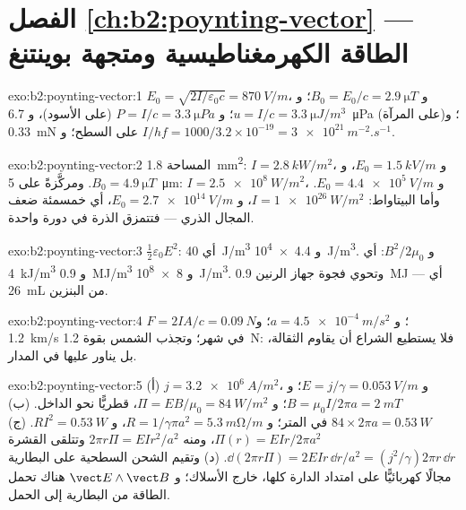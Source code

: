 \section*{الفصل \ref{ch:b2:poynting-vector} --- الطاقة الكهرمغناطيسية ومتجهة بوينتنغ}

\begin{solution}{exo:b2:poynting-vector:1}
$E_0 = \sqrt{2I/\varepsilon_0c} = \qty{870}{V/m}$، و $B_0 = E_0/c = \qty{2.9}{\micro T}$؛ و $u = I/c
= \qty{3.3}{\micro J/m^3}$؛ و $P = I/c = \qty{3.3}{\micro Pa}$ (على الأسود)، و \qty{6.7}{\micro Pa}
(على المرآة)؛ و \qty{0.33}{mN} على السطح؛ و $I/hf = 1000/3.2 \times 10^{-19} = \qty{3e21}{m^{-2}.s^{-1}}$.
\end{solution}

\begin{solution}{exo:b2:poynting-vector:2}
المساحة \qty{1.8}{mm^2}: $I = \qty{2.8}{kW/m^2}$، و $E_0 = \qty{1.5}{kV/m}$، و $B_0 = \qty{4.9}{\micro T}$.
ومركَّزةً على \qty{5}{\micro m}: $I = \qty{2.5e8}{W/m^2}$، و $E_0 = \qty{4.4e5}{V/m}$. وأما البيتاواط:
$I = \qty{1e26}{W/m^2}$، و $E_0 = \qty{2.7e14}{V/m}$، أي خمسمئة ضعف المجال
الذري --- فتتمزق الذرة في دورة واحدة.
\end{solution}

\begin{solution}{exo:b2:poynting-vector:3}
$\tfrac12\varepsilon_0E^2$: أي \qty{40}{J/m^3} و \qty{4.4e4}{J/m^3}. و $B^2/2\mu_0$: أي \qty{4}{kJ/m^3}
و \qty{0.9}{MJ/m^3} و \qty{8e8}{J/m^3}. وتحوي فجوة جهاز الرنين \qty{0.9}{MJ} --- أي \qty{26}{mL}
من البنزين.
\end{solution}

\begin{solution}{exo:b2:poynting-vector:4}
$F = 2IA/c = \qty{0.09}{N}$؛ و $a = \qty{4.5e-4}{m/s^2}$؛ و \qty{1.2}{km/s} في شهر؛
وتجذب الشمس بقوة \qty{1.2}{N}: فلا يستطيع الشراع أن يقاوم الثقالة، بل يناور
عليها في المدار.
\end{solution}

\begin{solution}{exo:b2:poynting-vector:5}
(أ) $j = \qty{3.2e6}{A/m^2}$، و $E = j/\gamma = \qty{0.053}{V/m}$؛ و $B = \mu_0I/2\pi a = \qty{2}{mT}$؛
و $\Pi = EB/\mu_0 = \qty{84}{W/m^2}$، قطريًّا نحو الداخل. (ب) $84 \times 2\pi a = \qty{0.53}{W}$
في المتر؛ و $R = 1/\gamma\pi a^2 = \qty{5.3}{m\ohm/m}$، و $RI^2 = \qty{0.53}{W}$. (ج) $\Pi(r)
= EIr/2\pi a^2$، ومنه $2\pi r\Pi = EIr^2/a^2$ وتتلقى القشرة $\dd(2\pi r\Pi)
= 2EIr\,\dd r/a^2 = (j^2/\gamma)2\pi r\,\dd r$. (د) وتقيم الشحن السطحية على البطارية
مجالًا كهربائيًّا على امتداد الدارة كلها، خارج الأسلاك؛
و $\vect E\wedge\vect B$ هناك تحمل الطاقة من البطارية إلى الحمل.
\end{solution}

